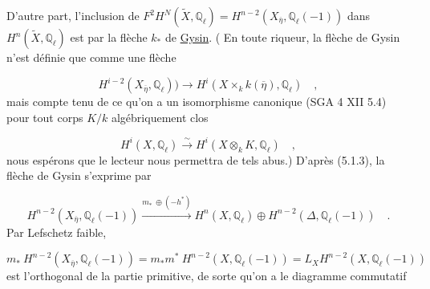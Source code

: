 D'autre part, l'inclusion de $F^2H^N(\widetilde{X},\mathbb{Q}_\ell) = H^{n-2}(X_{\overline{\eta}},\mathbb{Q}_\ell(-1))$ dans $H^n(\widetilde{X},\mathbb{Q}_\ell)$ est par la flèche $k_*$ de \underline{Gysin}. ( En toute riqueur, la flèche de Gysin n'est définie que comme une flèche

\begin{equation*}
H^{i-2}(X_{\overline{\eta}},\mathbb{Q}_\ell)) \longrightarrow H^i(X \times_k k(\overline{\eta}),\mathbb{Q}_\ell) \quad ,
\end{equation*}
mais compte tenu de ce qu'on a un isomorphisme canonique (SGA 4 XII 5.4) pour tout corps $K/k$ algébriquement clos

\begin{equation*}
H^i(X,\mathbb{Q}_\ell) \stackrel{\sim}{\longrightarrow} H^i(X \otimes_k K,\mathbb{Q}_\ell) \quad ,
\end{equation*}
nous espérons que le lecteur nous permettra de tels abus.) D'après (5.1.3), la flèche de Gysin s'exprime par

\begin{equation}\tag{5.7.8}
H^{n-2}(X_{\overline{\eta}},\mathbb{Q}_\ell(-1)) \stackrel{m_* \ \oplus(-h^*)}{\longrightarrow} H^n(X,\mathbb{Q}_\ell) \oplus H^{n-2}(\Delta,\mathbb{Q}_\ell(-1)) \quad .
\end{equation}
Par Lefschetz faible,

\begin{equation*}
m_* \ H^{n-2}(X_{\overline{\eta}},\mathbb{Q}_\ell(-1)) = m_*m^* \ H^{n-2}(X,\mathbb{Q}_\ell(-1)) = L_X H^{n-2}(X,\mathbb{Q}_\ell(-1))
\end{equation*}
est l'orthogonal de la partie primitive, de sorte qu'on a le diagramme commutatif

